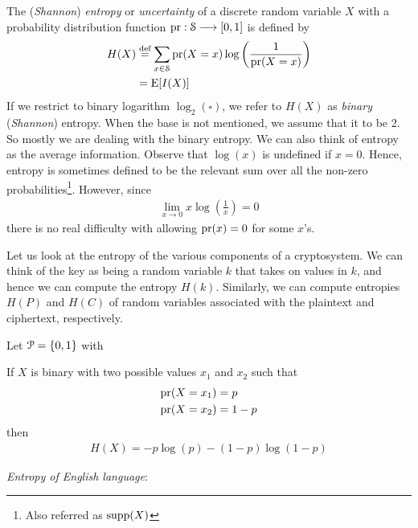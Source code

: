 \documentclass[a4paper, 12pt]{book} %
\begin{document}
\begin{definition}
    The (\emph{Shannon}) \emph{entropy} or \emph{uncertainty} of a discrete random variable $X$ with a probability distribution function $\operatorname{pr}: \EuScript{S} \longrightarrow [0,1]$ is defined by
    \begin{align}
        H(X) &\overset{\text{def}}{=} \sum_{x \in \EuScript{S}} \operatorname{pr}(X = x) \log\left( \frac{1}{\operatorname{pr}(X = x)} \right)  \\
        &= \mathrm{E}[I(X)]
    \end{align}
    If we restrict to binary logarithm $\log_2(\square)$, we refer to $H(X)$ as \emph{binary} (\emph{Shannon}) entropy. When the base is not mentioned, we assume that it to be 2. So mostly we are dealing with the binary entropy. We can also think of entropy as the average information. Observe that $\log(x)$ is undefined if $x = 0$. Hence, entropy is sometimes defined to be the relevant sum over all the non-zero probabilities\footnote{Also referred as $\operatorname{supp}(X)$}. However, since
        \begin{align}
        \lim_{x \longrightarrow 0} x \log\left( \frac{1}{x} \right) = 0
    \end{align}
    there is no real difficulty with allowing $\operatorname{pr}(x) = 0$ for some $x$'s. 
\end{definition}
Let us look at the entropy of the various components of a cryptosystem. We
can think of the key as being a random variable $k$ that takes on values in $k$, and hence we can compute the entropy $H(k)$. Similarly, we can compute entropies $H(P)$ and $H(C)$ of random variables associated with the plaintext and ciphertext, respectively. 

\begin{example}
    Let $\EuScript{P} = \{0,1\}$ with 

\end{example}

\begin{example}
    If $X$ is binary with two possible values $x_1$ and $x_2$ such that
    \begin{align}
        \operatorname{pr}(X = x_1) &= p \\
        \operatorname{pr}(X = x_2) &= 1-p
    \end{align}
    then 
    \begin{align}
        H(X) = - p \log(p) - (1-p)\log(1-p)
    \end{align}
\end{example}


\begin{example}
    \emph{Entropy of English language}:
\end{example}
\end{document}
